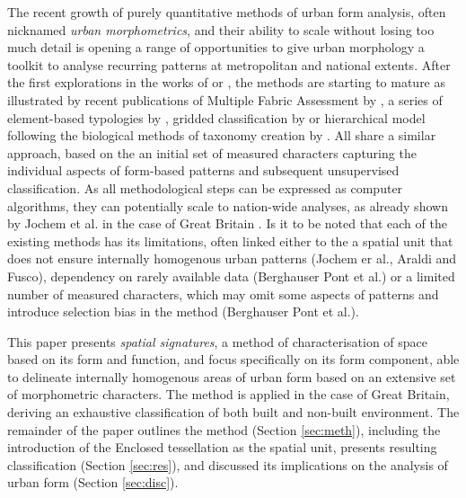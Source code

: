 The recent growth of purely quantitative methods of urban form analysis, often nicknamed
\textit{urban morphometrics}, and their ability to scale without losing too much detail
is opening a range of opportunities to give urban morphology a toolkit to analyse
recurring patterns at metropolitan and national extents. After the first explorations in
the works of \cite{gil2012} or \cite{hamaina2012a}, the methods are starting to mature
as illustrated by recent publications of Multiple Fabric Assessment by
\cite{araldi2019}, a series of element-based typologies by \cite{berghauserpont2019a},
gridded classification by \cite{jochem2020} or hierarchical model following the
biological methods of taxonomy creation by \cite{fleischmann2021a}. All share a similar
approach, based on the an initial set of measured characters capturing the individual
aspects of form-based patterns and subsequent unsupervised classification. As all
methodological steps can be expressed as computer algorithms, they can potentially scale
to nation-wide analyses, as already shown by Jochem et al. in the case of Great Britain
\citep{jochem2021tools}. Is it to be noted that each of the existing methods has its
limitations, often linked either to the a spatial unit that does not ensure internally
homogenous urban patterns (Jochem er al., Araldi and Fusco), dependency on rarely
available data (Berghauser Pont et al.) or a limited number of measured characters,
which may omit some aspects of patterns and introduce selection bias in the method
(Berghauser Pont et al.).

This paper presents \textit{spatial signatures}, a method of characterisation of space
based on its form and function, and focus specifically on its form component, able to
delineate internally homogenous areas of urban form based on an extensive set of
morphometric characters. The method is applied in the case of Great Britain, deriving an
exhaustive classification of both built and non-built environment. The remainder of the
paper outlines the method (Section \ref{sec:meth}), including the introduction of the
Enclosed tessellation as the spatial unit, presents resulting classification (Section
\ref{sec:res}), and discussed its implications on the analysis of urban form (Section
\ref{sec:disc}).